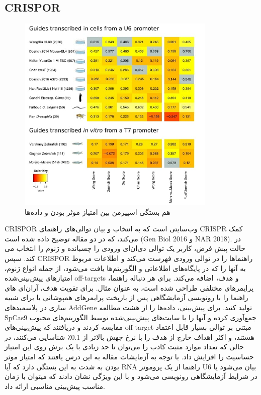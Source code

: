 \documentclass[12pt,a4paper,BCOR=.7cm,headsepline,bibliography=totoc]{report}
\begin{document}
\subsection{CRISPOR~\cite{CRISPOR}}
\begin{figure}
\centering
\includegraphics[width=9.5cm, ]{pictures/CRISPOR.jpg}
\caption{
هم بستگی اسپیرمن بین امتیاز موثر بودن و داده‌ها	
}\label{wrap-fig:4}
\end{figure}
CRISPOR
 وب‌سایتی است که به انتخاب و بیان توالی‌های راهنمای CRISPR کمک می‌کند، که در دو مقاله توضیح داده شده است (Gen Biol 2016 و NAR 2018). در حالت پیش فرض، کاربر یک توالی دی‌ان‌ای ورودی را چسبانده و ژنوم را انتخاب می کند. سپس CRISPOR راهنماها را در توالی ورودی فهرست می‌کند و اطلاعات مربوط به آنها را که در پایگاه‌های اطلاعاتی و الگوریتم‌ها یافت می‌شود، از جمله انواع ژنوم، امتیازهای پیش‌بینی‌شده off-targets و هدف، اضافه می‌کند. برای هر دنباله راهنما، پرایمرهای مختلفی طراحی شده است، به عنوان مثال. برای تقویت هدف، آر‌ان‌ای های راهنما را با رونویسی آزمایشگاهی پس از بازپخت پرایمرهای همپوشانی یا برای شبیه سازی در پلاسمیدهای AddGene تولید کنید.
برای پیش‌بینی، داده‌ها را از هشت مطالعه  SpCas9 جمع‌آوری کرده و آنها را با سایت‌های پیش‌بینی‌شده توسط الگوریتم‌های محبوب مقایسه کردند و دریافتند که پیش‌بینی‌های off-target مبتنی بر توالی بسیار قابل اعتماد هستند، و اکثر اهداف خارج از هدف را با نرخ جهش بالاتر از 0.1٪ شناسایی می‌کنند، در حالی که تعداد موارد مثبت کاذب را می‌توان تا حد زیادی با یک برش روی این امتیاز حساسیت را افزایش داد. با توجه به آزمایشات مقاله به این درس یافتند که امتیاز موثر بودن به شدت به این بستگی دارد که آیا RNA راهنما از یک پروموتر U6 بیان می‌شود یا در شرایط آزمایشگاهی رونویسی می‌شود و با این ویژگی نشان دادند که میتوان با زمان مناسب پیش‌بینی مناسبی ارائه داد.
\end{document}
